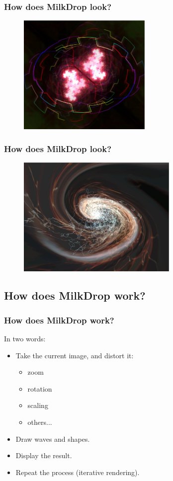\documentclass{beamer}
\begin{document}
\frame
{
  \frametitle{How does MilkDrop look?}
  \begin{figure}[H]
  \includegraphics[height=58mm]{milkdrop2.eps}
  \end{figure}
}

\frame
{
  \frametitle{How does MilkDrop look?}
  \begin{figure}[H]
  \includegraphics[height=58mm]{milkdrop3.eps}
  \end{figure}
}

\subsection{How does MilkDrop work?}
\frame
{
  \frametitle{How does MilkDrop work?}

In two words:
  \begin{itemize}
  \item Take the current image, and distort it:
  \begin{itemize}
    \item zoom
    \item rotation
    \item scaling
    \item others...
  \end{itemize}
  \item Draw waves and shapes.
  \item Display the result.
  \item Repeat the process (iterative rendering).
  \end{itemize}
}
\end{document}
